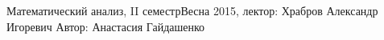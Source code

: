 



\BigHeader
	{Математический анализ, II семестр}{Весна 2015, лектор: Храбров Александр Игоревич}
	{Автор: Анастасия Гайдашенко}



